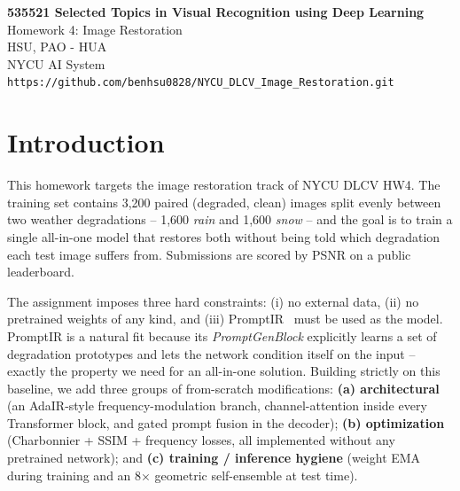 \documentclass[12pt, a4paper]{article}
\begin{document}
\begin{center}
    \LARGE \textbf{535521 Selected Topics in Visual Recognition using Deep Learning}\\[0.4em]
    \large Homework 4: Image Restoration\\
    \large HSU, PAO - HUA\\
    \normalsize NYCU AI System\\
    \vspace{0.5em}
    \normalsize \texttt{https://github.com/benhsu0828/NYCU_DLCV_Image_Restoration.git}
\end{center}

\vspace{1em}

\begingroup
\footnotesize
\section{Introduction}
\label{sec:intro}

This homework targets the image restoration track of NYCU DLCV HW4. The training set contains 3{,}200 paired (degraded, clean) images split evenly between two weather degradations -- 1{,}600 \textit{rain} and 1{,}600 \textit{snow} -- and the goal is to train a single all-in-one model that restores both without being told which degradation each test image suffers from. Submissions are scored by PSNR on a public leaderboard.

The assignment imposes three hard constraints: (i) no external data, (ii) no pretrained weights of any kind, and (iii) PromptIR~\cite{potlapalli2023promptir} must be used as the model. PromptIR is a natural fit because its \textit{PromptGenBlock} explicitly learns a set of degradation prototypes and lets the network condition itself on the input -- exactly the property we need for an all-in-one solution. Building strictly on this baseline, we add three groups of from-scratch modifications: \textbf{(a) architectural} (an AdaIR-style frequency-modulation branch, channel-attention inside every Transformer block, and gated prompt fusion in the decoder); \textbf{(b) optimization} (Charbonnier + SSIM + frequency losses, all implemented without any pretrained network); and \textbf{(c) training / inference hygiene} (weight EMA during training and an 8$\times$ geometric self-ensemble at test time).
\end{document}
